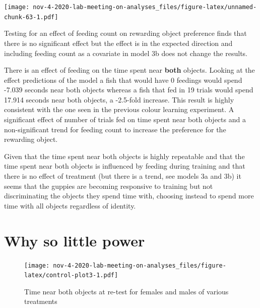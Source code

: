 \documentclass[]{book}
\begin{document}
\texttt{[image: nov-4-2020-lab-meeting-on-analyses\_files/figure-latex/unnamed-chunk-63-1.pdf]}

Testing for an effect of feeding count on rewarding object preference
finds that there is no significant effect but the effect is in the
expected direction and including feeding count as a covariate in model
3b does not change the results.

There is an effect of feeding on the time spent near \textbf{both}
objects. Looking at the effect predictions of the model a fish that
would have 0 feedings would spend -7.039 seconds near both objects
whereas a fish that fed in 19 trials would spend 17.914 seconds near
both objects, a -2.5-fold increase. This result is highly consistent
with the one seen in the previous colour learning experiment. A
significant effect of number of trials fed on time spent near both
objects and a non-significant trend for feeding count to increase the
preference for the rewarding object.

Given that the time spent near both objects is highly repeatable and
that the time spent near both objects is influenced by feeding during
training and that there is no effect of treatment (but there is a trend,
see models 3a and 3b) it seems that the guppies are becoming responsive
to training but not discriminating the objects they spend time with,
choosing instead to spend more time with all objects regardless of
identity.

\chapter{Why so little power}\label{why-so-little-power}

\begin{figure}
\centering
\texttt{[image: nov-4-2020-lab-meeting-on-analyses\_files/figure-latex/control-plot3-1.pdf]}
\caption{\label{fig:control-plot3}Time near both objects at re-test for
females and males of various treatments}
\end{figure}


\end{document}
